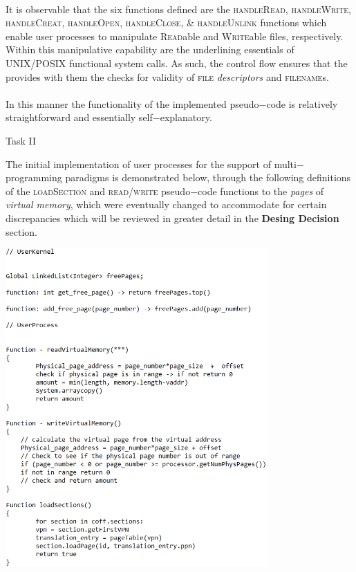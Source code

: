 \documentclass[12pt]{article}
\begin{document}
{\paragraph{}It is observable that the six functions defined are the
 \textsc{handleRead}, \textsc{handleWrite}, \textsc{handleCreat}, \textsc{handleOpen}, \textsc{handleClose}, \& \textsc{handleUnlink}
 functions which enable user processes to manipulate \textsc{Read}able and \textsc{Write}able files, respectively. Within this manipulative capability are the underlining
 essentials of UNIX/POSIX functional system calls. As such, the control flow ensures that the provides with them the checks for validity of \textsc{file} \textit{descriptors}
 and \textsc{filename}s. \\ \paragraph{}In this manner the functionality of the implemented pseudo$-$code is relatively straightforward and essentially self$-$explanatory.  
\begin{center}Task II\end{center}
The initial implementation of user processes for the support of multi$-$programming paradigms is demonstrated below, through the following definitions 
of the \textsc{loadSection} and \textsc{read}/\textsc{write} pseudo$-$code functions to the \textit{pages} of \textit{virtual memory},
which were eventually changed to accommodate for certain discrepancies which will be reviewed in greater detail in the \textbf{Desing Decision} section.
\begin{center}\includegraphics[width=100mm]{pic2.png}\end{center}
}
\end{document}
